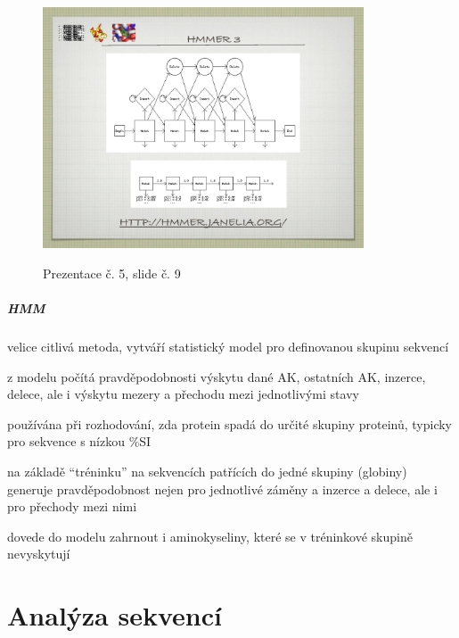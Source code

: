 \documentclass[DIV=8]{scrreprt}
\begin{document}
\begin{figure}
    \caption{Prezentace č. 5, slide č. 9}
    \includegraphics[width=0.85\textwidth]{slides-5/slide-9.jpg}
    \centering
    \label{slides-5-slide-9}
\end{figure}

\paragraph{HMM}
\begin{myItemize}[nosep]
    \item velice citlivá metoda, vytváří statistický model pro definovanou skupinu sekvencí
\begin{myItemize}[nosep]
    \item z modelu počítá pravděpodobnosti výskytu dané AK, ostatních AK, inzerce, delece, ale i výskytu mezery a přechodu mezi jednotlivými stavy
\end{myItemize}

    \item používána při rozhodování, zda protein spadá do určité skupiny proteinů, typicky pro sekvence s nízkou \%SI
    \item na základě “tréninku” na sekvencích patřících do jedné skupiny (globiny) generuje pravděpodobnost nejen pro jednotlivé záměny a inzerce a delece, ale i pro přechody mezi nimi
    \item dovede do modelu zahrnout i aminokyseliny, které se v tréninkové skupině nevyskytují
\end{myItemize}



\chapter{Analýza sekvencí} \label{Analýza sekvencí}
\end{document}
